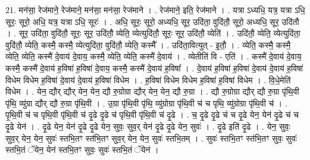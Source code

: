 \documentclass[17pt]{extarticle}
\begin{document}
21. मन॑सा॒ रेज॑माने॒ रेज॑माने॒ मन॑सा॒ मन॑सा॒ रेज॑माने । . रेज॑माने॒ इति॒ रेज॑माने । . यत्रा ऽध्यधि॒ यत्र॒ यत्रा ऽधि॒ सूरः॒ सूरो॒ अधि॒ यत्र॒ यत्रा ऽधि॒ सूरः॑ । . अधि॒ सूरः॒ सूरो॒ अध्यधि॒ सूर॒ उदि॑ता॒ वुदि॑तौ॒ सूरो॒ अध्यधि॒ सूर॒ उदि॑तौ । . सूर॒ उदि॑ता॒ वुदि॑तौ॒ सूरः॒ सूर॒ उदि॑तौ॒ व्येति॒ व्येत्युदि॑तौ॒ सूरः॒ सूर॒ उदि॑तौ॒ व्येति॑ । . उदि॑तौ॒ व्येति॒ व्येत्युदि॑ता॒ वुदि॑तौ॒ व्येति॒ कस्मै॒ कस्मै॒ व्येत्युदि॑ता॒ वुदि॑तौ॒ व्येति॒ कस्मै᳚ । . उदि॑ता॒वित्युत् - इ॒तौ॒ । . व्येति॒ कस्मै॒ कस्मै॒ व्येति॒ व्येति॒ कस्मै॑ दे॒वाय॑ दे॒वाय॒ कस्मै॒ व्येति॒ व्येति॒ कस्मै॑ दे॒वाय॑ । . व्येतीति॑ वि - एति॑ । . कस्मै॑ दे॒वाय॑ दे॒वाय॒ कस्मै॒ कस्मै॑ दे॒वाय॑ ह॒विषा॑ ह॒विषा॑ दे॒वाय॒ कस्मै॒ कस्मै॑ दे॒वाय॑ ह॒विषा᳚ । . दे॒वाय॑ ह॒विषा॑ ह॒विषा॑ दे॒वाय॑ दे॒वाय॑ ह॒विषा॑ विधेम विधेम ह॒विषा॑ दे॒वाय॑ दे॒वाय॑ ह॒विषा॑ विधेम । . ह॒विषा॑ विधेम विधेम ह॒विषा॑ ह॒विषा॑ विधेम । . वि॒धे॒मेति॑ विधेम । . येन॒ द्यौर् द्यौर् येन॒ येन॒ द्यौ रु॒ग्रोग्रा द्यौर् येन॒ येन॒ द्यौ रु॒ग्रा । . द्यौ रु॒ग्रोग्रा द्यौर् द्यौ रु॒ग्रा पृ॑थि॒वी पृ॑थि॒ व्यु॑ग्रा द्यौर् द्यौ रु॒ग्रा पृ॑थि॒वी । . उ॒ग्रा पृ॑थि॒वी पृ॑थि॒ व्यु॑ग्रोग्रा पृ॑थि॒वी च॑ च पृथि॒ व्यु॑ग्रोग्रा पृ॑थि॒वी च॑ । . पृ॒थि॒वी च॑ च पृथि॒वी पृ॑थि॒वी च॑ दृ॒ढे दृ॒ढे च॑ पृथि॒वी पृ॑थि॒वी च॑ दृ॒ढे । . च॒ दृ॒ढे दृ॒ढे च॑ च दृ॒ढे येन॒ येन॑ दृ॒ढे च॑ च दृ॒ढे येन॑ । . दृ॒ढे येन॒ येन॑ दृ॒ढे दृ॒ढे येन॒ सुवः॒ सुव॒र् येन॑ दृ॒ढे दृ॒ढे येन॒ सुवः॑ । . दृ॒ढे इति॑ दृ॒ढे । . येन॒ सुवः॒ सुव॒र् येन॒ येन॒ सुवः॑ स्तभि॒तꣳ स्त॑भि॒तꣳ सुव॒र् येन॒ येन॒ सुवः॑ स्तभि॒तम् । . सुवः॑ स्तभि॒तꣳ स्त॑भि॒तꣳ सुवः॒ सुवः॑ स्तभि॒तं ॅयेन॒ येन॑ स्तभि॒तꣳ सुवः॒ सुवः॑ स्तभि॒तं ॅयेन॑ । \newline
\end{document}
